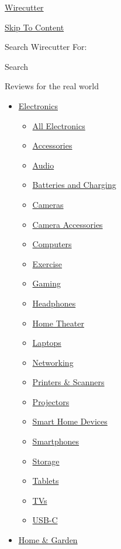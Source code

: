 \href{https://www.nytimes3xbfgragh.onion/wirecutter/}{Wirecutter}

\protect\hyperlink{main}{Skip To Content}

 Search Wirecutter For:

 Search

Reviews for the real world

\begin{itemize}
\tightlist
\item
  \href{/wirecutter/electronics/}{Electronics}

  \begin{itemize}
  \tightlist
  \item
    \href{/wirecutter/electronics/}{All Electronics}
  \item
    \href{/wirecutter/electronics/accessories/}{Accessories}
  \item
    \href{/wirecutter/electronics/audio/}{Audio}
  \item
    \href{/wirecutter/electronics/batteries/}{Batteries and Charging}
  \item
    \href{/wirecutter/electronics/cameras/}{Cameras}
  \item
    \href{/wirecutter/electronics/camera-accessories/}{Camera
    Accessories}
  \item
    \href{/wirecutter/electronics/computers/}{Computers}
  \item
    \href{/wirecutter/health-fitness/exercise/}{Exercise}
  \item
    \href{/wirecutter/electronics/gaming/}{Gaming}
  \item
    \href{/wirecutter/electronics/headphones/}{Headphones}
  \item
    \href{/wirecutter/electronics/home-theater/}{Home Theater}
  \item
    \href{/wirecutter/electronics/laptops/}{Laptops}
  \item
    \href{/wirecutter/electronics/networking/}{Networking}
  \item
    \href{/wirecutter/office/printers-scanners/}{Printers \& Scanners}
  \item
    \href{/wirecutter/electronics/projectors/}{Projectors}
  \item
    \href{/wirecutter/home-garden/smart-home/}{Smart Home Devices}
  \item
    \href{/wirecutter/electronics/smartphones/}{Smartphones}
  \item
    \href{/wirecutter/electronics/storage-devices/}{Storage}
  \item
    \href{/wirecutter/electronics/tablets/}{Tablets}
  \item
    \href{/wirecutter/electronics/tvs/}{TVs}
  \item
    \href{/wirecutter/electronics/usb-c/}{USB-C}
  \end{itemize}
\item
  \href{/wirecutter/home-garden/}{Home \& Garden}


\end{itemize}

